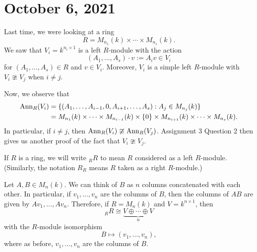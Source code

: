 \section{October 6, 2021}
Last time, we were looking at a ring 
\[ R = M_{n_1}(k) \times \cdots \times M_{n_s}(k). \] 
We saw that $V_i = k^{n_i \times 1}$ is a left $R$-module with the action 
\[ (A_1, \dots, A_s) \cdot v := A_i v \in V_i \] 
for $(A_1, \dots, A_s) \in R$ and $v \in V_i$. Moreover, $V_i$ is a 
simple left $R$-module with $V_i \ncong V_j$ when $i \neq j$. 

Now, we observe that 
\begin{align*} 
    \operatorname{Ann}_R(V_i) &= \{(A_1, \dots, A_{i-1}, 0, A_{i+1}, \dots, A_s) : 
    A_j \in M_{n_j}(k)\} \\
    &= M_{n_1}(k) \times \cdots \times M_{n_{i-1}}(k) \times \{0\} 
    \times M_{n_{i+1}}(k) \times \cdots \times M_{n_s}(k). 
\end{align*} 
In particular, if $i \neq j$, then $\operatorname{Ann}_R(V_i) \ncong \operatorname{Ann}_R(V_j)$. 
Assignment 3 Question 2 then gives us another proof of the fact that 
$V_i \ncong V_j$. 

\begin{defn}{}
    If $R$ is a ring, we will write ${}_R R$ to mean $R$ considered as a left 
    $R$-module. (Similarly, the notation $R_R$ means $R$ taken as a right 
    $R$-module.)
\end{defn}

Let $A, B \in M_n(k)$. We can think of $B$ as $n$ columns concatenated 
with each other. In particular, if $v_1, \dots, v_n$ are the columns of $B$, 
then the columns of $AB$ are given by $Av_1, \dots, Av_n$. 
Therefore, if $R = M_n(k)$ and $V = k^{n \times 1}$, then 
\[ {}_R R \cong \underbrace{V \oplus \cdots \oplus V}_{n} \] 
with the $R$-module isomorphism 
\[ B \mapsto (v_1, \dots, v_n), \] 
where as before, $v_1, \dots, v_n$ are the columns of $B$. 

